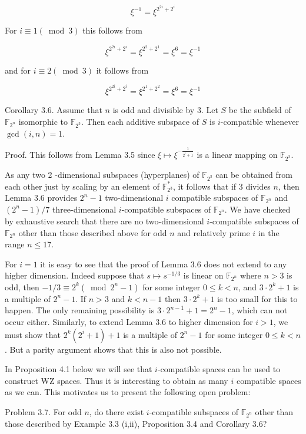\documentclass[10pt]{article}
\begin{document}
$$
\xi^{-1}=\xi^{2^{2 i}+2^{i}}
$$

For $i \equiv 1(\bmod 3)$ this follows from

$$
\xi^{2^{2 i}+2^{i}}=\xi^{2^{2}+2^{1}}=\xi^{6}=\xi^{-1}
$$

and for $i \equiv 2(\bmod 3)$ it follows from

$$
\xi^{2^{2 i}+2^{i}}=\xi^{2^{1}+2^{2}}=\xi^{6}=\xi^{-1}
$$

Corollary 3.6. Assume that $n$ is odd and divisible by 3. Let $S$ be the subfield of $\mathbb{F}_{2^{n}}$ isomorphic to $\mathbb{F}_{2^{3}}$. Then each additive subspace of $S$ is $i$-compatible whenever $\operatorname{gcd}(i, n)=1$.

Proof. This follows from Lemma 3.5 since $\xi \mapsto \xi^{-\frac{1}{2^{i}+1}}$ is a linear mapping on $\mathbb{F}_{2^{3}}$.

As any two 2 -dimensional subspaces (hyperplanes) of $\mathbb{F}_{2^{3}}$ can be obtained from each other just by scaling by an element of $\mathbb{F}_{2^{3}}^{*}$, it follows that if 3 divides $n$, then Lemma 3.6 provides $2^{n}-1$ two-dimensional $i$ compatible subspaces of $\mathbb{F}_{2^{n}}$ and $\left(2^{n}-1\right) / 7$ three-dimensional $i$-compatible subspaces of $\mathbb{F}_{2^{n}}$. We have checked by exhaustive search that there are no two-dimensional $i$-compatible subspaces of $\mathbb{F}_{2^{n}}$ other than those described above for odd $n$ and relatively prime $i$ in the range $n \leq 17$.

For $i=1$ it is easy to see that the proof of Lemma 3.6 does not extend to any higher dimension. Indeed suppose that $s \mapsto s^{-1 / 3}$ is linear on $\mathbb{F}_{2^{n}}$ where $n>3$ is odd, then $-1 / 3 \equiv 2^{k}\left(\bmod 2^{n}-1\right)$ for some integer $0 \leq k<n$, and $3 \cdot 2^{k}+1$ is a multiple of $2^{n}-1$. If $n>3$ and $k<n-1$ then $3 \cdot 2^{k}+1$ is too small for this to happen. The only remaining possibility is $3 \cdot 2^{n-1}+1=2^{n}-1$, which can not occur either. Similarly, to extend Lemma 3.6 to higher dimension for $i>1$, we must show that $2^{k}\left(2^{i}+1\right)+1$ is a multiple of $2^{n}-1$ for some integer $0 \leq k<n$. But a parity argument shows that this is also not possible.

In Proposition 4.1 below we will see that $i$-compatible spaces can be used to construct WZ spaces. Thus it is interesting to obtain as many $i$ compatible spaces as we can. This motivates us to present the following open problem:

Problem 3.7. For odd $n$, do there exist $i$-compatible subspaces of $\mathbb{F}_{2^{n}}$ other than those described by Example 3.3 (i,ii), Proposition 3.4 and Corollary 3.6?
\end{document}
